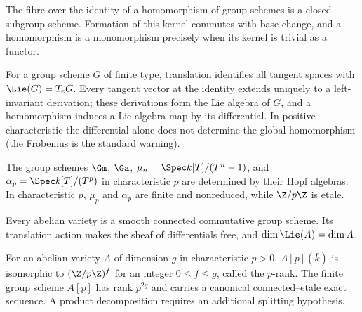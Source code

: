 \begin{lemma}
\label{mumford-lem-group-scheme-kernel}
The fibre over the identity of a homomorphism of group schemes is a closed
subgroup scheme.  Formation of this kernel commutes with base change, and a
homomorphism is a monomorphism precisely when its kernel is trivial as a
functor.
\notready
\end{lemma}

\begin{proposition}
\label{mumford-prop-group-scheme-lie}
For a group scheme $G$ of finite type, translation identifies all tangent
spaces with $\Lie(G)=T_eG$.  Every tangent vector at the identity extends
uniquely to a left-invariant derivation; these derivations form the Lie algebra
of $G$, and a homomorphism induces a Lie-algebra map by its differential.  In
positive characteristic the differential alone does not determine the global
homomorphism (the Frobenius is the standard warning).
\notready
\end{proposition}

\begin{proposition}
\label{mumford-prop-standard-finite-groups}
The group schemes $\Gm$, $\Ga$, $\mu_n=\Spec k[T]/(T^n-1)$, and
$\alpha_p=\Spec k[T]/(T^p)$ in characteristic $p$ are determined by their
Hopf algebras.  In characteristic $p$, $\mu_p$ and $\alpha_p$ are finite and
nonreduced, while $\Z/p\Z$ is etale.
\notready
\end{proposition}

\begin{theorem}
\label{mumford-thm-abelian-smooth}
Every abelian variety is a smooth connected commutative group scheme.  Its
translation action makes the sheaf of differentials free, and
$\dim\Lie(A)=\dim A$.
\notready
\end{theorem}

\begin{proposition}
\label{mumford-prop-p-rank}
For an abelian variety $A$ of dimension $g$ in characteristic $p>0$,
$A[p](\bar k)$ is isomorphic to $(\Z/p\Z)^f$ for an integer
$0\leq f\leq g$, called the $p$-rank.  The finite group scheme $A[p]$ has
rank $p^{2g}$ and carries a canonical connected--etale exact sequence.  A
product decomposition requires an additional splitting hypothesis.
\notready
\end{proposition}

